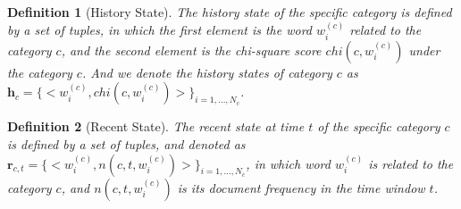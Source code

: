 \documentclass{article}
\newtheorem{rmk}{Definition}%
\begin{document}
\begin{rmk}[History State] 
The history state of the specific category is defined by a set of tuples, in which the first element is the word \(w^{(c)}_i\) related to the category \(c\), and the second element is the chi-square score \(chi(c,w^{(c)}_{i})\) under the category \(c\). 
And we denote the history states of category \(c\) as \(\bm{h}_c=\{<w^{(c)}_i,chi(c,w^{(c)}_{i})>\}_{i=1,...,N_c}\).
\end{rmk}

\begin{rmk}[Recent State] 
The recent state at time \(t\) of the specific category \(c\) is defined by a set of tuples, and denoted as \(\bm{r}_{c,t}=\{<w^{(c)}_i,n(c,t,w^{(c)}_{i})>\}_{i=1,...,N_c}\), in which word \(w^{(c)}_{i}\) is related to the category \(c\), and \(n(c,t,w^{(c)}_{i})\) is its document frequency in the time window \(t\).
\end{rmk}
\end{document}
